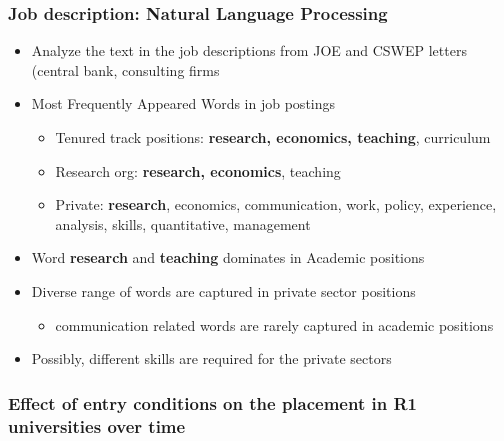 \documentclass[11pt]{beamer}
\begin{document}
%
%	
%

\begin{frame}[label = NLP]
	\frametitle{Job description: Natural Language Processing}
	\begin{itemize}
		\item Analyze the text in the job descriptions from JOE and CSWEP letters (central bank, consulting firms
		\item Most Frequently Appeared Words in job postings
		\begin{itemize}
			\item Tenured track positions: \textbf{research, economics, teaching}, curriculum
			\item Research org: \textbf{research, economics}, teaching
			\item Private: \textbf{research}, economics, communication, work, policy, experience, analysis, skills, quantitative, management
		\end{itemize}
		
		\item Word \textbf{research} and \textbf{teaching} dominates in Academic positions
		\item Diverse range of words are captured in private sector positions
		\begin{itemize}
			\item communication related words are rarely captured in academic positions
		\end{itemize} 
		\item Possibly, different skills are required for the private sectors \hyperlink{Occupation}{}
	\end{itemize}
\end{frame}




{
	\begin{frame}[label = signal]
		\frametitle{Effect of entry conditions on the placement in R1 universities over time}
		
		\hyperlink{discussion}{}
	\end{frame}
}
\end{document}

